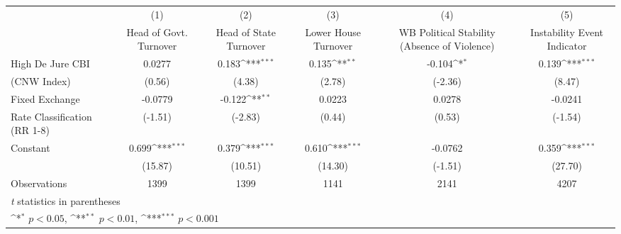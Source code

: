 {
\def\sym#1{\ifmmode^{#1}\else\(^{#1}\)\fi}
\begin{tabular}{l*{5}{c}}
\toprule
                &\multicolumn{1}{c}{(1)}&\multicolumn{1}{c}{(2)}&\multicolumn{1}{c}{(3)}&\multicolumn{1}{c}{(4)}&\multicolumn{1}{c}{(5)}\\
                &\multicolumn{1}{c}{Head of Govt. Turnover}&\multicolumn{1}{c}{Head of State Turnover}&\multicolumn{1}{c}{Lower House Turnover}&\multicolumn{1}{c}{WB Political Stability (Absence of Violence)}&\multicolumn{1}{c}{Instability Event Indicator}\\
\midrule
High De Jure CBI&   0.0277         &    0.183\sym{***}&    0.135\sym{**} &   -0.104\sym{*}  &    0.139\sym{***}\\
(CNW Index)     &   (0.56)         &   (4.38)         &   (2.78)         &  (-2.36)         &   (8.47)         \\
\addlinespace
Fixed Exchange  &  -0.0779         &   -0.122\sym{**} &   0.0223         &   0.0278         &  -0.0241         \\
Rate Classification (RR 1-8)&  (-1.51)         &  (-2.83)         &   (0.44)         &   (0.53)         &  (-1.54)         \\
\addlinespace
Constant        &    0.699\sym{***}&    0.379\sym{***}&    0.610\sym{***}&  -0.0762         &    0.359\sym{***}\\
                &  (15.87)         &  (10.51)         &  (14.30)         &  (-1.51)         &  (27.70)         \\
\midrule
Observations    &     1399         &     1399         &     1141         &     2141         &     4207         \\
\bottomrule
\multicolumn{6}{l}{\footnotesize \textit{t} statistics in parentheses}\\
\multicolumn{6}{l}{\footnotesize \sym{*} \(p<0.05\), \sym{**} \(p<0.01\), \sym{***} \(p<0.001\)}\\
\end{tabular}
}
